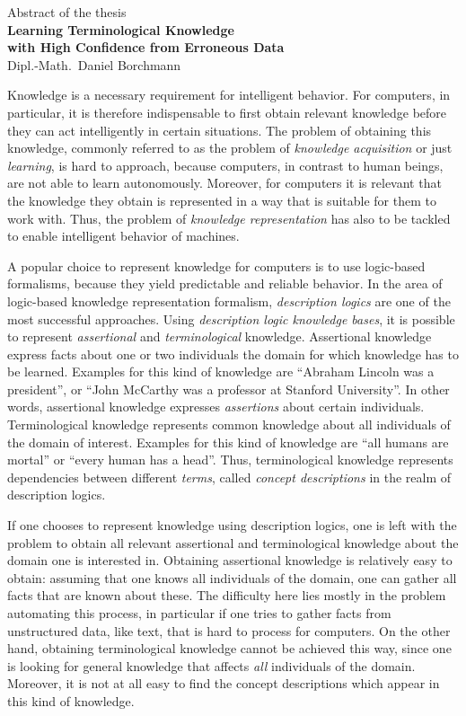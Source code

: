 \documentclass[english]{scrartcl}
\begin{document}
\medskip
\begin{center}
  \normalsize Abstract of the thesis\\
  \LARGE\textbf{Learning Terminological Knowledge\\ with High Confidence from Erroneous
    Data}\\
  \bigskip%
  \large Dipl.-Math.\ Daniel Borchmann
\end{center}
\bigskip
\bigskip

\noindent
Knowledge is a necessary requirement for intelligent behavior.  For computers, in
particular, it is therefore indispensable to first obtain relevant knowledge before they
can act intelligently in certain situations.  The problem of obtaining this knowledge,
commonly referred to as the problem of \emph{knowledge acquisition} or just
\emph{learning}, is hard to approach, because computers, in contrast to human beings, are
not able to learn autonomously.  Moreover, for computers it is relevant that the knowledge
they obtain is represented in a way that is suitable for them to work with.  Thus, the
problem of \emph{knowledge representation} has also to be tackled to enable intelligent
behavior of machines.

A popular choice to represent knowledge for computers is to use logic-based formalisms,
because they yield predictable and reliable behavior.  In the area of logic-based
knowledge representation formalism, \emph{description logics} are one of the most
successful approaches.  Using \emph{description logic knowledge bases}, it is possible to
represent \emph{assertional} and \emph{terminological} knowledge.  Assertional knowledge
express facts about one or two individuals the domain for which knowledge has to be
learned.  Examples for this kind of knowledge are \enquote{Abraham Lincoln was a
  president}, or \enquote{John McCarthy was a professor at Stanford University}.  In other
words, assertional knowledge expresses \emph{assertions} about certain individuals.
Terminological knowledge represents common knowledge about all individuals of the domain
of interest.  Examples for this kind of knowledge are \enquote{all humans are mortal} or
\enquote{every human has a head}.  Thus, terminological knowledge represents dependencies
between different \emph{terms}, called \emph{concept descriptions} in the realm of
description logics.

If one chooses to represent knowledge using description logics, one is left with the
problem to obtain all relevant assertional and terminological knowledge about the domain
one is interested in.  Obtaining assertional knowledge is relatively easy to obtain:
assuming that one knows all individuals of the domain, one can gather all facts that are
known about these.  The difficulty here lies mostly in the problem automating this
process, in particular if one tries to gather facts from unstructured data, like text,
that is hard to process for computers.  On the other hand, obtaining terminological
knowledge cannot be achieved this way, since one is looking for general knowledge that
affects \emph{all} individuals of the domain.  Moreover, it is not at all easy to find the
concept descriptions which appear in this kind of knowledge.

\printbibliography{}
\end{document}
